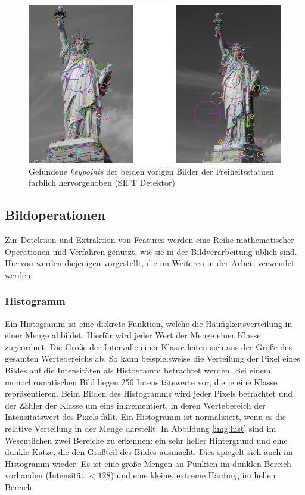 \begin{figure}
	\centering
	\includegraphics[scale=0.6]{images/liberty_kp.png}
	\caption{Gefundene \textit{keypoints} der beiden vorigen Bilder der Freiheitsstatuen farblich hervorgehoben (SIFT Detektor)}
	\label{img:keypoints}
\end{figure}

\subsection{Bildoperationen}

Zur Detektion und Extraktion von Features werden eine Reihe mathematischer Operationen und Verfahren genutzt, wie sie in der Bildverarbeitung üblich sind. Hiervon werden diejenigen vorgestellt, die im Weiteren in der Arbeit verwendet werden.

\subsubsection{Histogramm}

Ein Histogramm ist eine diskrete Funktion, welche die Häufigkeitsverteilung in einer Menge abbildet. Hierfür wird jeder Wert der Menge einer Klasse zugeordnet. Die Größe der Intervalle einer Klasse leiten sich aus der Größe des gesamten Wertebereichs ab. So kann beispielsweise die Verteilung der Pixel eines Bildes auf die Intensitäten als Histogramm betrachtet werden. Bei einem monochromatischen Bild liegen 256 Intensitätswerte vor, die je eine Klasse repräsentieren. Beim Bilden des Histogramms wird jeder Pixels betrachtet und der Zähler der Klasse um eins inkrementiert, in deren Wertebereich der Intensitätswert des Pixels fällt. Ein Histogramm ist normalisiert, wenn es die relative Verteilung in der Menge darstellt.
In Abbildung \ref{img:hist} sind im Wesentlichen zwei Bereiche zu erkennen: ein sehr heller Hintergrund und eine dunkle Katze, die den Großteil des Bildes ausmacht. Dies spiegelt sich auch im Histogramm wieder: Es ist eine große Mengen an Punkten im dunklen Bereich vorhanden (Intensität $< 128$) und eine kleine, extreme Häufung im hellen Bereich.

